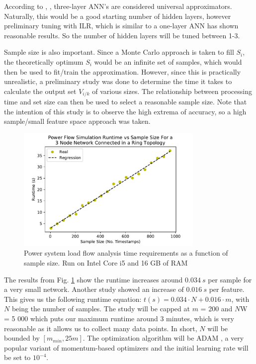 \documentclass[conference]{IEEEtran}
\begin{document}
According to \cite{chen1994}, \cite{du2014}, three-layer ANN's are considered universal approximators. Naturally, this would be a good starting number of hidden layers, however preliminary tuning with ILR, which is similar to a one-layer ANN has shown reasonable results. So the number of hidden layers will be tuned between 1-3. 

Sample size is also important. Since a Monte Carlo approach is taken to fill $S_{i}$, the theoretically optimum $S_{i}$ would be an infinite set of samples, which would then be used to fit/train the approximation. However, since this is practically unrealistic, a preliminary study was done to determine the time it takes to calculate the output set $V_{i/k}$ of various sizes. The relationship between processing time and set size can then be used to select a reasonable sample size. Note that the intention of this study is to observe the high extrema of accuracy, so a high sample/small feature space approach was taken.

\begin{figure}[h]
	\centering
	\includegraphics[width=9cm]{pslfruntimevssamples.pdf}
	\caption{Power system load flow analysis time requirements as a function of sample size. Run on Intel Core i5 and 16 GB of RAM}
	\label{fig:pslfruntime}
\end{figure}

The results from Fig. \ref{fig:pslfruntime} show the runtime increases around $0.034~s$ per sample for a very small network. Another study showed an increase of $0.016~s$ per feature. This gives us the following runtime equation: $t(s) = 0.034\cdot N + 0.016\cdot m$, with $N$ being the number of samples. The study will be capped at $m$ = 200 and $N$W = 5 000 which puts our maximum runtime around 3 minutes, which is very reasonable as it allows us to collect many data points. In short, $N$ will be bounded by $[m_{min}, 25m]$. The optimization algorithm will be ADAM \cite{died2015}, a very popular variant of momentum-based optimizers and the initial learning rate will be set to $10^{-4}$.
 
\end{document}
